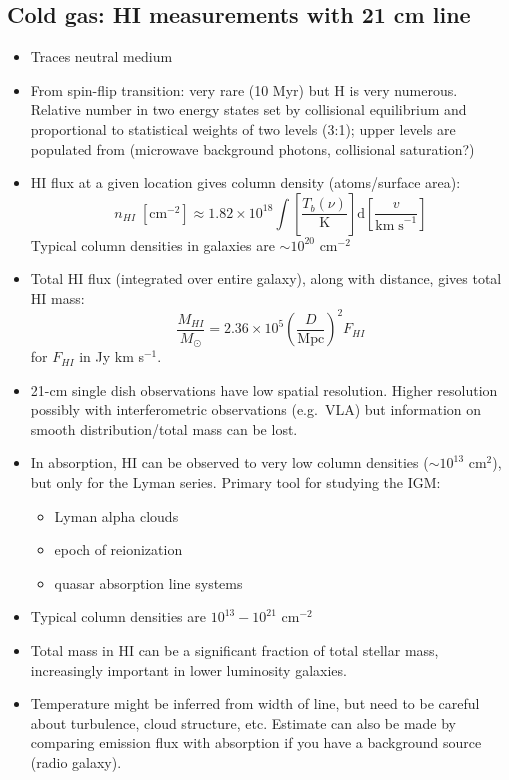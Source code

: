 \documentclass{article}
\begin{document}
\subsection{Cold gas: HI measurements with 21 cm line}
\begin{itemize}
    \item Traces neutral medium
    \item From spin-flip transition: very rare (10 Myr) but H is very
        numerous. Relative number in two energy states set by collisional
        equilibrium and proportional to statistical weights of two levels
        (3:1); upper levels are populated from (microwave background photons,
        collisional saturation?)
    \item HI flux at a given location gives column density (atoms/surface
        area):
        \[
        n_{HI}\; [\mathrm{cm}^{-2}] \approx 1.82\times10^{18}\int{
            \left[\frac{T_{b}(\nu)}{\mathrm{K}}\right]\mathrm{d}
            \left[\frac{v}{\mathrm{km\;s}^{-1}}\right]}
        \]
        Typical column densities in galaxies are
        $\sim 10^{20}$ cm$^{-2}$
    \item Total HI flux (integrated over entire galaxy), along with distance,
        gives total HI mass:
        \[
            \frac{M_{HI}}{M_{\odot}} = 2.36\times10^{5}\left(
            \frac{D}{\mathrm{Mpc}}\right)^{2}F_{HI}
            \]
        for $F_{HI}$ in Jy km s$^{-1}$.
    \item 21-cm single dish observations have low spatial resolution.
        Higher resolution possibly with interferometric observations
        (e.g.\ VLA) but information on smooth distribution/total mass can
        be lost.
    \item In absorption, HI can be observed to very low column densities
        ($\sim10^{13}$ cm$^{2}$), but only for
        the Lyman series. Primary tool for studying the IGM:
        \begin{itemize}
            \item Lyman alpha clouds
            \item epoch of reionization
            \item quasar absorption line systems
        \end{itemize}
    \item Typical column densities are $10^{13} - 10^{21}$ cm$^{-2}$
    \item Total mass in HI can be a significant fraction of total stellar
        mass, increasingly important in lower luminosity galaxies.
    \item Temperature might be inferred from width of line, but need to
        be careful about turbulence, cloud structure, etc. Estimate can
        also be made by comparing emission flux with absorption if you
        have a background source (radio galaxy).
\end{itemize}
\end{document}
